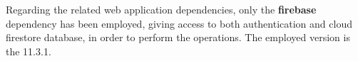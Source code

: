 \noindent Regarding the related web application dependencies, only the \textbf{firebase} \cite{Firebase} dependency has been employed, giving access to both authentication and cloud firestore database, in order to perform the operations. The employed version is the 11.3.1.

\newpage